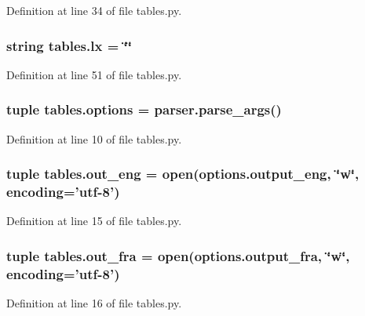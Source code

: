 Definition at line 34 of file tables.\+py.

\hypertarget{namespacetables_a73769ae2602de53f31750beff002ea18}{
\subsubsection[{lx}]{\setlength{\rightskip}{0pt plus 5cm}string tables.\+lx = \char`\"{}\char`\"{}}}\label{namespacetables_a73769ae2602de53f31750beff002ea18}


Definition at line 51 of file tables.\+py.

\hypertarget{namespacetables_a2afda4842d5e225c323bccb8a6acd91e}{
\subsubsection[{options}]{\setlength{\rightskip}{0pt plus 5cm}tuple tables.\+options = parser.\+parse\+\_\+args()}}\label{namespacetables_a2afda4842d5e225c323bccb8a6acd91e}


Definition at line 10 of file tables.\+py.

\hypertarget{namespacetables_afe00514807dd9e76c7ff40483db626f6}{
\subsubsection[{out\+\_\+eng}]{\setlength{\rightskip}{0pt plus 5cm}tuple tables.\+out\+\_\+eng = open(options.\+output\+\_\+eng, \char`\"{}w\char`\"{}, encoding='utf-\/8')}}\label{namespacetables_afe00514807dd9e76c7ff40483db626f6}


Definition at line 15 of file tables.\+py.

\hypertarget{namespacetables_ad2465fc8e1cdec591a177bed2fdde2d7}{
\subsubsection[{out\+\_\+fra}]{\setlength{\rightskip}{0pt plus 5cm}tuple tables.\+out\+\_\+fra = open(options.\+output\+\_\+fra, \char`\"{}w\char`\"{}, encoding='utf-\/8')}}\label{namespacetables_ad2465fc8e1cdec591a177bed2fdde2d7}


Definition at line 16 of file tables.\+py.

